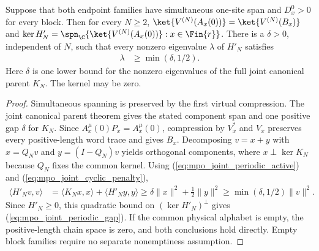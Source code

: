 \begin{lemma}
    \label{thm:mpo_joint_periodic_gap}
    \leanok
    Suppose that both endpoint families have simultaneous one-site span
    and $D_x^0>0$ for every block. Then for every $N\ge2$,
    $\ket{V^{(N)}(A_x(0))}=\ket{V^{(N)}(B_x)}$ and
    $\ker H'_N=\spn_{\C}\{\ket{V^{(N)}(A_x(0))}:x\in\Fin{r}\}$.
    There is a $\delta>0$, independent of $N$, such that every
    nonzero eigenvalue $\lambda$ of $H'_N$ satisfies
    \begin{align}
        \lambda & \ge\min(\delta,1/2).
        \label{eq:mpo_joint_periodic_gap}
    \end{align}
    Here $\delta$ is one lower bound for the nonzero eigenvalues of the
    full joint canonical parent $K_N$. The kernel may be zero.
\end{lemma}
\begin{proof}
    \leanok
    Simultaneous spanning is preserved by the first virtual compression.
    The joint canonical parent theorem gives the stated component span
    and one positive gap $\delta$ for $K_N$. Since
    $A_x^\mu(0)P_x=A_x^\mu(0)$, compression by $V_x^*$ and $V_x$
    preserves every positive-length word trace and gives $B_x$.
    Decomposing $v=x+y$ with $x=Q_Nv$ and $y=(I-Q_N)v$ yields orthogonal
    components, where $x\perp\ker K_N$ because $Q_N$ fixes the common kernel.
    Using (\ref{eq:mpo_joint_periodic_active}) and
    (\ref{eq:mpo_joint_cyclic_penalty}),
    \begin{align}
        \langle H'_Nv,v\rangle
         & =\langle K_Nx,x\rangle+\langle H'_Ny,y\rangle
        \ge\delta\|x\|^2+\tfrac12\|y\|^2
        \ge\min(\delta,1/2)\|v\|^2.
    \end{align}
    Since $H'_N\ge0$, this quadratic bound on $(\ker H'_N)^\perp$ gives
    (\ref{eq:mpo_joint_periodic_gap}). If the common
    physical alphabet is empty, the positive-length chain space is zero,
    and both conclusions hold directly. Empty block families require no
    separate nonemptiness assumption.
\end{proof}

